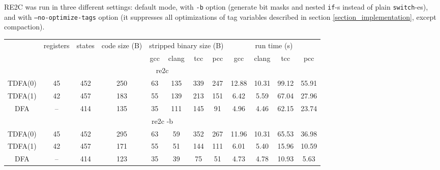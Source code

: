 \documentclass{article}
\theoremstyle{definition}
\begin{document}
\begin{multicols}{2}
RE2C was run in three different settings:
default mode, with \texttt{-b} option (generate bit masks and nested \texttt{if}-s instead of plain \texttt{switch}-es),
and with \texttt{--no-optimize-tags} option (it suppresses all optimizations
of tag variables described in section \ref{section_implementation}, except compaction).
\\

\begin{table}\label{table1}
\begin{center}
    \begin{tabular}{|c|ccccccccccc|}
    \hline
    & registers & states & code size (B) & \multicolumn{4}{c}{stripped binary size (B)} & \multicolumn{4}{c|}{run time (s)} \\
    & & &
        & gcc & clang & tcc & pcc
        & gcc & clang & tcc & pcc \\
    \hline \hline
    \multicolumn{12}{|c|}{re2c} \\
    \hline
    TDFA(0) & 45 & 452 & 250 & 63 & 135 & 339 & 247 & 12.88 & 10.31 & 99.12 & 55.91 \\
    TDFA(1) & 42 & 457 & 183 & 55 & 139 & 213 & 151 &  6.42 &  5.59 & 67.04 & 27.96 \\
    DFA     & -- & 414 & 135 & 35 & 111 & 145 &  91 &  4.96 &  4.46 & 62.15 & 23.74 \\
    \hline \hline
    \multicolumn{12}{|c|}{re2c -b} \\
    \hline
    TDFA(0) & 45 & 452 & 295 & 63 & 59 & 352 & 267 & 11.96 & 10.31 & 65.53 & 36.98 \\
    TDFA(1) & 42 & 457 & 171 & 55 & 51 & 144 & 111 &  6.01 &  5.40 & 15.96 & 10.59 \\
    DFA     & -- & 414 & 123 & 35 & 39 &  75 &  51 &  4.73 &  4.78 & 10.93 &  5.63 \\

\end{tabular}
\end{center}
\end{table}
\end{multicols}
\end{document}

